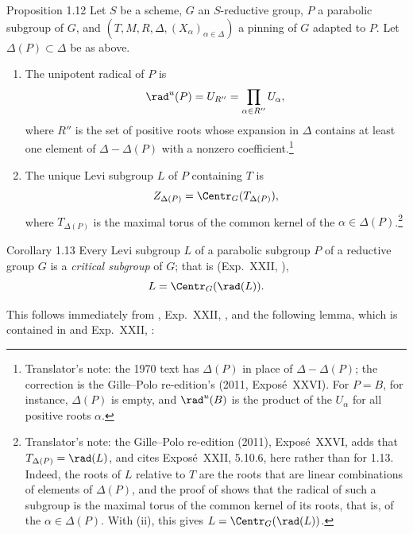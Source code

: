 \begin{sgastatement}{Proposition 1.12}
Let \(S\) be a scheme, \(G\) an \(S\)-reductive group, \(P\) a parabolic
subgroup of \(G\), and
\((T,M,R,\Delta,(X_\alpha)_{\alpha\in\Delta})\) a pinning of \(G\) adapted
to \(P\).  Let \(\Delta(P)\subset\Delta\) be as above.
\begin{enumerate}[label=\textup{(\roman*)}]
\item The unipotent radical of \(P\) is
\[
 \rad^u(P)=U_{R''}=\prod_{\alpha\in R''}U_\alpha,
\]
where \(R''\) is the set of positive roots whose expansion in \(\Delta\)
contains at least one element of
\(\Delta-\Delta(P)\) with a
nonzero coefficient.\footnote{Translator's note: the 1970 text has \(\Delta(P)\) in place of
\(\Delta-\Delta(P)\); the correction is the Gille--Polo re-edition's (2011,
Exposé~XXVI). For \(P=B\), for instance, \(\Delta(P)\) is empty, and
\(\rad^u(B)\) is the product of the \(U_\alpha\) for all positive roots
\(\alpha\).}
\item The unique Levi subgroup \(L\) of \(P\) containing \(T\) is
\[
 Z_{\Delta(P)}=\Centr_G(T_{\Delta(P)}),
\]
where \(T_{\Delta(P)}\) is the maximal torus of the common kernel of the
\(\alpha\in\Delta(P)\).\footnote{Translator's note: the Gille--Polo re-edition (2011), Exposé~XXVI, adds
that \(T_{\Delta(P)}=\rad(L)\), and cites Exposé~XXII, 5.10.6, here rather
than for 1.13. Indeed, the roots of \(L\) relative to \(T\) are the roots that
are linear combinations of elements of \(\Delta(P)\), and the proof of
 shows that the radical of such a subgroup is the
maximal torus of the common kernel of its roots, that is, of the
\(\alpha\in\Delta(P)\). With (ii), this gives \(L=\Centr_G(\rad(L))\).}
\end{enumerate}
\end{sgastatement}

\begin{sgastatement}{Corollary 1.13}
Every Levi subgroup \(L\) of a parabolic subgroup \(P\) of a reductive group
\(G\) is a \emph{critical subgroup} of \(G\); that is
\textup{(Exp.\ XXII, )},
\[
 L=\Centr_G(\rad(L)).
\]
\end{sgastatement}

This follows immediately from , Exp.\ XXII, , and the following
lemma, which is
contained in  and Exp.\ XXII, :

